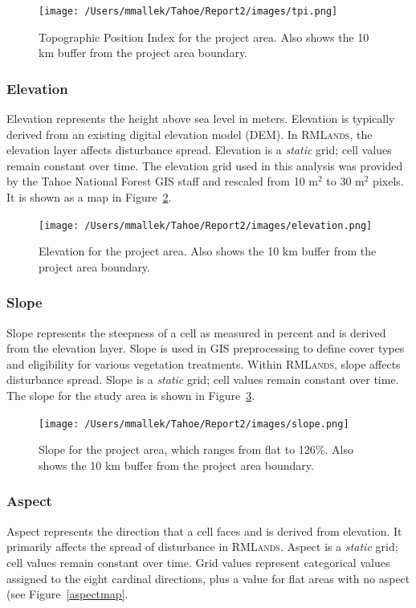 \begin{figure}[htbp]
\centering
\texttt{[image: /Users/mmallek/Tahoe/Report2/images/tpi.png]}
\caption{Topographic Position Index for the project area. Also shows the 10 km buffer from the project area boundary.} 
\label{tpimap}
\end{figure}

\subsubsection{Elevation} 
Elevation represents the height above sea level in meters. Elevation is typically derived from an existing digital elevation model (DEM). In \textsc{RMLands}, the elevation layer affects disturbance spread.  Elevation is a \emph{static} grid; cell values remain constant over time. The elevation grid used in this analysis was provided by the Tahoe National Forest GIS staff and rescaled from 10 m$^2$ to 30 m$^2$ pixels. It is shown as a map in Figure~\ref{elevationmap}.

\begin{figure}[htbp]
\centering
\texttt{[image: /Users/mmallek/Tahoe/Report2/images/elevation.png]}
\caption{Elevation for the project area. Also shows the 10 km buffer from the project area boundary.} 
\label{elevationmap}
\end{figure}

\subsubsection{Slope} 
Slope represents the steepness of a cell as measured in percent and is derived from the elevation layer. Slope is used in GIS preprocessing to define cover types and eligibility for various vegetation treatments. Within \textsc{RMLands}, slope affects disturbance spread. Slope is a \emph{static} grid; cell values remain constant over time. The slope for the study area is shown in Figure~\ref{slopemap}.

\begin{figure}[htbp]
\centering
\texttt{[image: /Users/mmallek/Tahoe/Report2/images/slope.png]}
\caption{Slope for the project area, which ranges from flat to 126\%. Also shows the 10 km buffer from the project area boundary.} 
\label{slopemap}
\end{figure}

\subsubsection{Aspect} Aspect represents the direction that a cell faces and is derived from elevation. It primarily affects the spread of disturbance in \textsc{RMLands}. Aspect is a \emph{static} grid; cell values remain constant over time. Grid values represent categorical values assigned to the eight cardinal directions, plus a value for flat areas with no aspect (see Figure~\ref{aspectmap}. 

